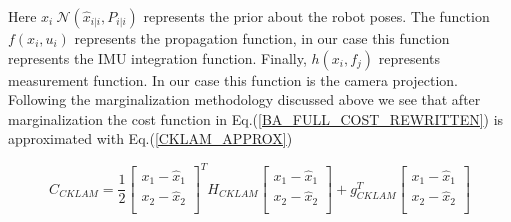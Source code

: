 Here $x_i ~ \mathcal{N}(\hat x_{i|i}, P_{i|i})$ represents the prior about the robot poses. The function $f(x_i, u_i)$ represents the propagation function, in our case this function represents the IMU integration function. Finally, $h(x_i,f_j)$ represents measurement function. In our case this function is the camera projection. Following the marginalization methodology discussed above we see that after marginalization the cost function in Eq.(\ref{BA_FULL_COST_REWRITTEN}) is approximated with Eq.(\ref{CKLAM_APPROX})

\begin{equation}
	C_{CKLAM} = \frac{1}{2}
							\begin{bmatrix} 
								x_{1} - \hat x_{1} \\
								x_{2} - \hat x_{2} \\
							\end{bmatrix}^T H_{CKLAM} 
							\begin{bmatrix} 
								x_{1} - \hat x_{1} \\
								x_{2} - \hat x_{2} \\
							\end{bmatrix} + g_{CKLAM}^T
							\begin{bmatrix} 
								x_{1} - \hat x_{1} \\
								x_{2} - \hat x_{2} \\
							\end{bmatrix}
	\label{CKLAM_APPROX}
\end{equation}

